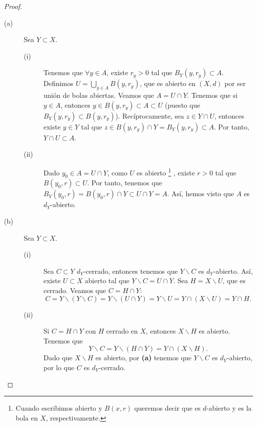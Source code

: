 \begin{proof}
\begin{description}
\item[(a)] Sea $\displaystyle Y \subset X $.
	\begin{description}
	\item[(i)] Tenemos que $\displaystyle \forall y \in A $, existe $\displaystyle r_{y}>0 $ tal que $\displaystyle B_{Y}\left(y,r_{y}\right) \subset A $. Definimos $\displaystyle U = \bigcup_{y \in A}B\left(y,r_{y}\right) $, que es abierto en $\displaystyle \left(X,d\right) $ por ser unión de bolas abiertas.
Veamos que $\displaystyle A = U \cap Y $. Tenemos que si $\displaystyle y \in A $, entonces $\displaystyle y \in B\left(y, r_{y}\right) \subset A \subset U $ (puesto que $\displaystyle B_{Y}\left(y, r_{y}\right) \subset B\left(y, r_{y}\right) $).
Recíprocamente, sea $\displaystyle z \in Y \cap U $, entonces existe $\displaystyle y \in Y $ tal que $\displaystyle z \in B\left(y,r_{y}\right) \cap Y = B_{Y}\left(y,r_{y}\right) \subset A$. Por tanto, $\displaystyle Y \cap U \subset A $.
	\item[(ii)] Dado $\displaystyle y_{0} \in A = U \cap Y $, como $\displaystyle U $ es abierto \footnote{Cuando escribimos abierto y $\displaystyle B\left(x,r\right) $ queremos decir que es $\displaystyle d $-abierto y es la bola en $\displaystyle X $, respectivamente.} , existe $\displaystyle r > 0 $ tal que $\displaystyle B\left(y_{0}, r\right)\subset U $. Por tanto, tenemos que $\displaystyle B_{Y}\left(y_{0}, r\right) = B\left(y_{0}, r\right)\cap Y \subset U \cap Y = A $. Así, hemos visto que $\displaystyle A $ es $\displaystyle d _{Y} $-abierto.
	\end{description}
\item[(b)] Sea $\displaystyle Y \subset X $.
	\begin{description}
	\item[(i)] Sea $\displaystyle C \subset Y $ $\displaystyle d _{Y} $-cerrado, entonces tenemos que $\displaystyle Y\backslash C $ es $\displaystyle d _{Y} $-abierto. Así, existe $\displaystyle U \subset X $ abierto tal que $\displaystyle Y\backslash C = U \cap Y $. Sea $\displaystyle H = X\backslash U $, que es cerrado. Veamos que $\displaystyle C = H \cap Y $:
\[C = Y \backslash \left(Y \backslash C\right) = Y \backslash \left(U \cap Y\right) = Y \backslash U = Y \cap \left(X\backslash U\right) = Y \cap H .\]
\item[(ii)] Si $\displaystyle C = H\cap Y $ con $\displaystyle H $ cerrado en $\displaystyle X $, entonces $\displaystyle X\backslash H $ es abierto. Tenemos que
	\[Y\backslash C = Y \backslash \left(H \cap Y\right) = Y \cap \left(X\backslash H\right) .\]
	Dado que $\displaystyle X\backslash H $ es abierto, por \textbf{(a)} tenemos que $\displaystyle Y\backslash C $ es $\displaystyle d _{Y} $-abierto, por lo que $\displaystyle C $ es $\displaystyle d _{Y} $-cerrado.
	\end{description}
\end{description}
\end{proof}
